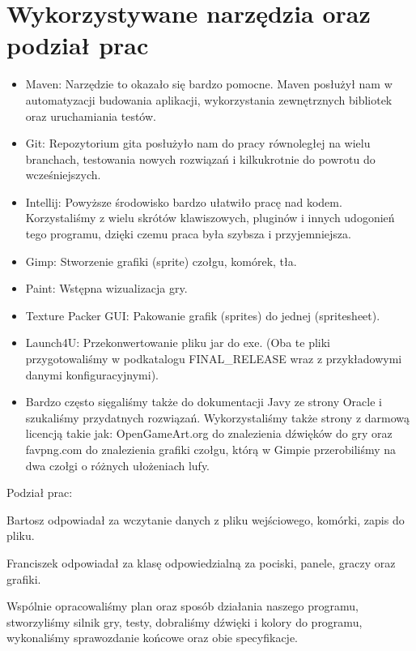 \documentclass{article}
\begin{document}
\newpage

\section{Wykorzystywane narzędzia oraz podział prac}
\begin{itemize}
    \item Maven:
Narzędzie to okazało się bardzo pomocne. Maven posłużył nam  w automatyzacji budowania aplikacji, wykorzystania zewnętrznych bibliotek oraz uruchamiania testów.

    \item Git:
Repozytorium gita posłużyło nam do pracy równoległej na wielu branchach, testowania nowych rozwiązań i kilkukrotnie do powrotu do wcześniejszych.

    \item Intellij:
Powyższe środowisko bardzo ułatwiło pracę nad kodem. Korzystaliśmy z wielu skrótów klawiszowych, pluginów i innych udogonień tego programu, dzięki czemu praca była szybsza i przyjemniejsza.

    \item Gimp:
Stworzenie grafiki (sprite) czołgu, komórek, tła.

    \item Paint:
Wstępna wizualizacja gry.

    \item Texture Packer GUI:
Pakowanie grafik (sprites) do jednej (spritesheet).

    \item Launch4U:
Przekonwertowanie pliku jar do exe. (Oba te pliki przygotowaliśmy w podkatalogu FINAL\_RELEASE wraz z przykładowymi danymi konfiguracyjnymi).
    \item Bardzo często sięgaliśmy także do dokumentacji Javy ze strony Oracle i szukaliśmy przydatnych rozwiązań.
Wykorzystaliśmy także strony z darmową licencją takie jak: OpenGameArt.org do znalezienia dźwięków do gry oraz favpng.com do znalezienia grafiki czołgu, którą w Gimpie przerobiliśmy na dwa czołgi o różnych ułożeniach lufy.
\end{itemize}
Podział prac:

Bartosz odpowiadał za wczytanie danych z pliku wejściowego, komórki, zapis do pliku.

Franciszek odpowiadał za klasę odpowiedzialną za pociski, panele, graczy oraz grafiki.


Wspólnie opracowaliśmy plan oraz sposób działania naszego programu, stworzyliśmy silnik gry, testy, dobraliśmy dźwięki i kolory do programu, wykonaliśmy sprawozdanie końcowe oraz obie specyfikacje.
\end{document}
